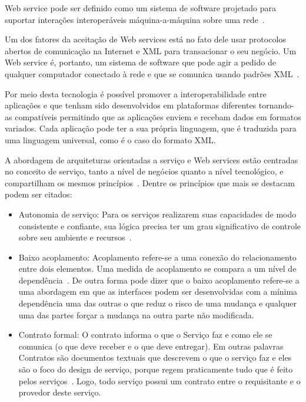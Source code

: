 Web service pode ser definido como um sistema de software projetado para suportar interações interoperáveis máquina-a-máquina sobre uma rede~\cite{Booth2004}.

Um dos fatores da aceitação de Web services está no fato dele usar protocolos abertos de comunicação na Internet e XML para transacionar o seu negócio. Um Web service é, portanto, um sistema de software que pode agir a pedido de qualquer computador conectado à rede e que se comunica usando padrões XML~\cite{Pulier2005}.

Por meio desta tecnologia é possível promover a interoperabilidade entre aplicações e que tenham sido desenvolvidos em plataformas diferentes tornando-as compatíveis permitindo que as aplicações enviem e recebam dados em formatos variados. Cada aplicação pode ter a sua própria linguagem, que é traduzida para uma linguagem universal, como é o caso do formato XML.

A abordagem de arquiteturas orientadas a serviço e Web services estão centradas no conceito de serviço, tanto a nível de negócios  quanto a nível tecnológico, e compartilham os mesmos princípios~\cite{Bertino2010}. Dentre os princípios que mais se destacam podem ser citados:

\begin{itemize}
    \item Autonomia de serviço: Para os serviços realizarem suas capacidades de modo consistente e confiante, sua lógica precisa ter um grau significativo de controle sobre seu ambiente e recursos~\cite{ERL09}.

    \item Baixo acoplamento: Acoplamento refere-se a uma conexão do relacionamento entre dois elementos. Uma medida de acoplamento se compara a um nível de dependência~\cite{ERL09}. De outra forma pode dizer que o baixo acoplamento refere-se a uma abordagem em que as interfaces podem ser desenvolvidas com a mínima dependência uma das outras o que reduz o risco  de uma mudança e qualquer uma das partes forçar a mudança na outra parte não modificada.

    \item Contrato formal: O contrato informa o que o Serviço faz e como ele se comunica (o que deve receber e o que deve entregar). Em outras palavras Contratos são documentos textuais que descrevem o que o serviço faz e eles são o foco do design de serviço, porque regem praticamente tudo que é feito pelos serviços~\cite{ERL09}. Logo, todo serviço possui um contrato entre o requisitante e o provedor deste serviço.

\end{itemize}

